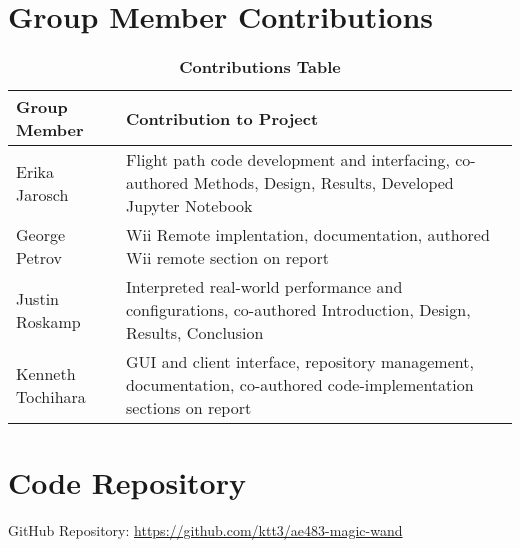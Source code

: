 \appendix

\section{Group Member Contributions} \label{apx:contributions}
    \begin{table}[H]
        \begin{center}
        \caption{\textbf{Contributions Table}}
        \begin{tabular}{ | p{2in} | p{4in}| } 
            \hline
            \textbf{Group Member} & \textbf{Contribution to Project} \\  \hline
            Erika Jarosch & Flight path code development and interfacing, co-authored Methods, Design, Results, Developed Jupyter Notebook\\ \hline
            George Petrov & Wii Remote implentation, documentation, authored Wii remote section on report\\ \hline
            Justin Roskamp & Interpreted real-world performance and configurations, co-authored Introduction, Design, Results, Conclusion   \\ \hline
            Kenneth Tochihara & GUI and client interface, repository management, documentation, co-authored code-implementation sections on report\\ \hline
        \end{tabular}
        \end{center}
    \end{table}

\section{Code Repository}
    GitHub Repository: \url{https://github.com/ktt3/ae483-magic-wand}
